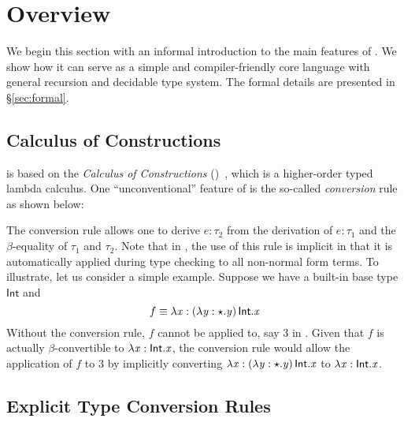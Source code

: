\section{Overview}


We begin this section with an informal introduction to the main features of \name. We show how it can serve as a simple and compiler-friendly core language with general recursion and decidable type system. The formal details are presented in \S\ref{sec:formal}.

\subsection{Calculus of Constructions}
\label{sec:coc}

\name is based on the \emph{Calculus of Constructions} (\coc)~\cite{coc}, which is a higher-order typed lambda calculus. One ``unconventional'' feature of \coc is the so-called \emph{conversion} rule as shown below:
\ottusedrule{\ottdruleTXXConv{}}

The conversion rule allows one to derive $e:\tau_{{\mathrm{2}}}$ from the derivation of $e:\tau_{{\mathrm{1}}}$ and the $\beta$-equality of $\tau_{{\mathrm{1}}}$ and $\tau_{{\mathrm{2}}}$. Note that in \coc, the use of this rule is implicit in that it is automatically applied during type checking to all non-normal form terms. To illustrate, let us consider a simple example. Suppose we have a built-in base type $ \mathsf{Int} $ and \[f \equiv \lambda  \mathit{x}  :  (  \lambda  \mathit{y}  :  \star  .  \mathit{y}  ) \, \mathsf{Int}  .  \mathit{x} \] Without the conversion rule, $f$ cannot be applied to, say $3$ in \coc. Given that $f$ is actually $\beta$-convertible to $\lambda  \mathit{x}  :  \mathsf{Int}  .  \mathit{x}$, the conversion rule would allow the application of $f$ to $3$ by implicitly converting $\lambda  \mathit{x}  :  (  \lambda  \mathit{y}  :  \star  .  \mathit{y}  ) \, \mathsf{Int}  .  \mathit{x}$ to $\lambda  \mathit{x}  :  \mathsf{Int}  .  \mathit{x}$.

\subsection{Explicit Type Conversion Rules}

